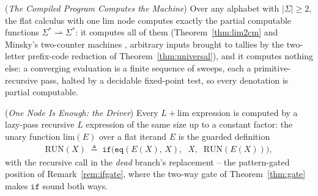 \begin{theorem}
    (\emph{The Compiled Program Computes the Machine})
    \label{thm:limpartial}
    Over any alphabet with $|\Sigma| \geq 2$, the flat calculus with one
    $\mathrm{lim}$ node computes exactly the partial computable
    functions $\Sigma^* \rightharpoonup \Sigma^*$: it computes all of
    them (Theorem~\ref{thm:lim2cm} and Minsky's two-counter machines
    \cite{minsky67}, arbitrary inputs brought to tallies by the
    two-letter prefix-code reduction of Theorem~\ref{thm:universal}),
    and it computes nothing else: a converging evaluation is a finite
    sequence of sweeps, each a primitive-recursive pass, halted by a
    decidable fixed-point test, so every denotation is partial
    computable.
\end{theorem}

\begin{proposition}
    (\emph{One Node Is Enough: the Driver})
    \label{prop:limcontain}
    Every $L{+}\mathrm{lim}$ expression is computed by a lazy-pass
    recursive $L$ expression of the same size up to a constant factor:
    the unary function $\mathrm{lim}(E)$ over a flat iterand $E$ is the
    guarded definition
    \begin{align}
        \mathrm{RUN}(X) \;\triangleq\; \mathtt{if}\big(\mathtt{eq}(E(X),\, X),\;\; X,\;\; \mathrm{RUN}(E(X))\big),
    \end{align}
    with the recursive call in the \emph{dead} branch's replacement --
    the pattern-gated position of Remark~\ref{rem:ifgate}, where the
    two-way gate of Theorem~\ref{thm:gate} makes $\mathtt{if}$ sound
    both ways.
\end{proposition}

